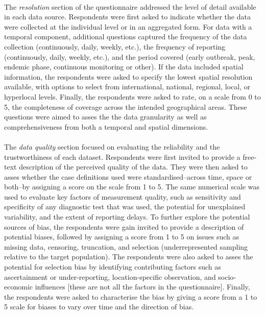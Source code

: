 \documentclass{article}
\begin{document}
\paragraph{}The \textit{resolution} section of the questionnaire addressed the level of detail available in each data source. Respondents were first asked to indicate whether the data were collected at the individual level or in an aggregated form. For data with a temporal component, additional questions captured the frequency of the data collection (continuously, daily, weekly, etc.), the frequency of reporting (continuously, daily, weekly, etc.), and the period covered (early outbreak, peak, endemic phase, continuous monitoring or other). If the data included spatial information, the respondents were asked to specify the lowest spatial resolution available, with options to select from international, national, regional, local, or hyperlocal levels. Finally, the respondents were asked to rate, on a scale from 0 to 5, the completeness of coverage across the intended geographical areas. These questions were aimed to asses the the data granularity as well as comprehensiveness from both a temporal and spatial dimensions. 

\paragraph{}The \textit{data quality} section focused on evaluating the reliability and the trustworthiness of each dataset. Respondents were first invited to provide a free-text description of the perceived quality of the data. They were then asked to asses whether the case definitions used were standardised--across time, space or both--by assigning a score on the scale from 1 to 5. The same numerical scale was used to evaluate key factors of measurement quality, such as sensitivity and specificity of any diagnostic test that was used, the potential for unexplained variability, and the extent of reporting delays. To further explore the potential sources of bias, the respondents were gain invited to provide a description of potential biases, followed by assigning a score from 1 to 5 on issues such as missing data, censoring, truncation, and selection (underrepresented sampling relative to the target population). The respondents were also asked to asses the potential for selection bias by identifying contributing factors such as ascertainment or under-reporting, location-specific observation, and socio-economic influences [these are not all the factors in the questionnaire]. Finally, the respondents were asked to characterise the bias by giving a score from a 1 to 5 scale for biases to vary over time and the direction of bias. 
\end{document}
